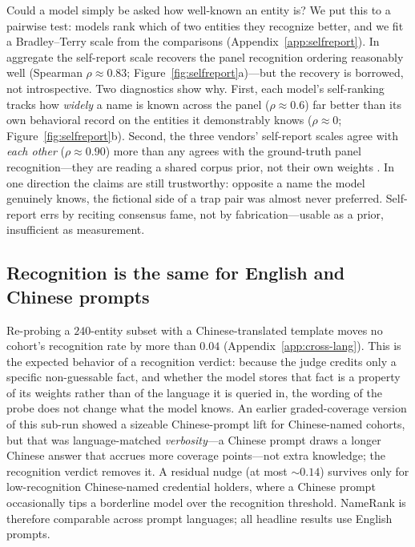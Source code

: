 \documentclass[11pt]{article}
\begin{document}
Could a model simply be asked how well-known an entity is? We put this to a pairwise test: models rank which of two entities they recognize better, and we fit a Bradley--Terry scale from the comparisons (Appendix~\ref{app:selfreport}). In aggregate the self-report scale recovers the panel recognition ordering reasonably well (Spearman $\rho \approx 0.83$; Figure~\ref{fig:selfreport}a)---but the recovery is borrowed, not introspective. Two diagnostics show why. First, each model's self-ranking tracks how \emph{widely} a name is known across the panel ($\rho \approx 0.6$) far better than its own behavioral record on the entities it demonstrably knows ($\rho \approx 0$; Figure~\ref{fig:selfreport}b). Second, the three vendors' self-report scales agree with \emph{each other} ($\rho \approx 0.90$) more than any agrees with the ground-truth panel recognition---they are reading a shared corpus prior, not their own weights \citep{kadavath2022language, yin2023selfaware}. In one direction the claims are still trustworthy: opposite a name the model genuinely knows, the fictional side of a trap pair was almost never preferred. Self-report errs by reciting consensus fame, not by fabrication---usable as a prior, insufficient as measurement.

\subsection{Recognition is the same for English and Chinese prompts}
\label{sec:results-language}

Re-probing a $240$-entity subset with a Chinese-translated template moves no cohort's recognition rate by more than $0.04$ (Appendix~\ref{app:cross-lang}). This is the expected behavior of a recognition verdict: because the judge credits only a specific non-guessable fact, and whether the model stores that fact is a property of its weights rather than of the language it is queried in, the wording of the probe does not change what the model knows. An earlier graded-coverage version of this sub-run showed a sizeable Chinese-prompt lift for Chinese-named cohorts, but that was language-matched \emph{verbosity}---a Chinese prompt draws a longer Chinese answer that accrues more coverage points---not extra knowledge; the recognition verdict removes it. A residual nudge (at most ${\sim}0.14$) survives only for low-recognition Chinese-named credential holders, where a Chinese prompt occasionally tips a borderline model over the recognition threshold. NameRank is therefore comparable across prompt languages; all headline results use English prompts.
\end{document}
